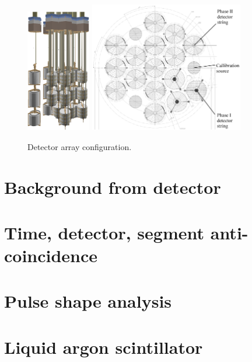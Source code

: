 \begin{figure}[tbhp]
  \centering
  \includegraphics[width=0.25\textwidth]{array}\hfil
  \includegraphics[width=0.6\textwidth]{arrayTop}  
  \caption{Detector array configuration.}
  \label{fig:array}
\end{figure}


\section{Background from detector}
\label{sec:gerda:source}

\section{Time, detector, segment anti-coincidence}
\label{sec:gerda:anti}
\section{Pulse shape analysis}
\label{sec:gerda:psa}

\section{Liquid argon scintillator}
\label{sec:gerda:scin}


